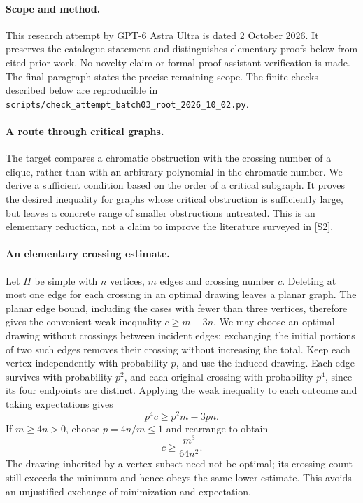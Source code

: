 \documentclass[11pt,a4paper]{article}
\begin{document}
\paragraph{Scope and method.}
This research attempt by GPT-6 Astra Ultra is dated 2 October 2026.
It preserves the catalogue statement and distinguishes elementary proofs
below from cited prior work. No novelty claim or formal proof-assistant
verification is made. The final paragraph states the precise remaining scope.
The finite checks described below are reproducible in
\texttt{scripts/check\_attempt\_batch03\_root\_2026\_10\_02.py}.
\paragraph{A route through critical graphs.}
The target compares a chromatic obstruction with the crossing
number of a clique, rather than with an arbitrary polynomial in
the chromatic number. We derive a sufficient condition based on
the order of a critical subgraph. It proves the desired inequality
for graphs whose critical obstruction is sufficiently large,
but leaves a concrete range of smaller obstructions untreated.
This is an elementary reduction, not a claim to improve the
literature surveyed in [S2].

\paragraph{An elementary crossing estimate.}
Let $H$ be simple with $n$ vertices, $m$ edges and crossing number
$c$. Deleting at most one edge for each crossing in an optimal
drawing leaves a planar graph. The planar edge bound, including
the cases with fewer than three vertices, therefore gives the
convenient weak inequality $c\ge m-3n$.
We may choose an optimal drawing without crossings between
incident edges: exchanging the initial portions of two such
edges removes their crossing without increasing the total.
Keep each vertex independently with probability $p$, and use
the induced drawing. Each edge survives with probability $p^2$,
and each original crossing with probability $p^4$, since its
four endpoints are distinct. Applying the weak inequality to
each outcome and taking expectations gives
\[
 p^4c\ge p^2m-3pn.
\]
If $m\ge4n>0$, choose $p=4n/m\le1$ and rearrange to obtain
\[
                         c\ge\frac{m^3}{64n^2}.
\]
The drawing inherited by a vertex subset need not be optimal;
its crossing count still exceeds the minimum and hence obeys
the same lower estimate. This avoids an unjustified exchange
of minimization and expectation.
\end{document}
